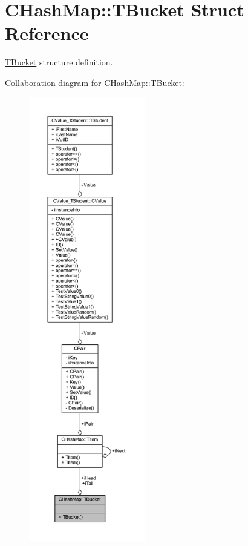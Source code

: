 \hypertarget{struct_c_hash_map_1_1_t_bucket}{}\section{C\+Hash\+Map\+:\+:T\+Bucket Struct Reference}
\label{struct_c_hash_map_1_1_t_bucket}


\hyperlink{struct_c_hash_map_1_1_t_bucket}{T\+Bucket} structure definition.  




Collaboration diagram for C\+Hash\+Map\+:\+:T\+Bucket\+:
\nopagebreak
\begin{figure}[H]
\begin{center}
\leavevmode
\includegraphics[height=550pt]{struct_c_hash_map_1_1_t_bucket__coll__graph}
\end{center}
\end{figure}
